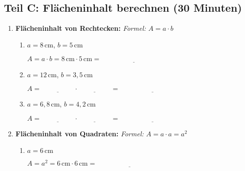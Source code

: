 \subsection*{Teil C: Flächeninhalt berechnen (30 Minuten)}

\begin{enumerate}[label=\arabic*.]
    \item \textbf{Flächeninhalt von Rechtecken:}
    \textit{Formel: $A = a \cdot b$}
    \vspace{0.5cm}

    \begin{enumerate}[label=\alph*)]
        \item $a = 8\,\text{cm}$, $b = 5\,\text{cm}$

        $A = a \cdot b = 8\,\text{cm} \cdot 5\,\text{cm} = \underline{\hspace{4cm}}$

        \vspace{0.5cm}

        \item $a = 12\,\text{cm}$, $b = 3{,}5\,\text{cm}$

        $A = \underline{\hspace{2cm}} \cdot \underline{\hspace{2cm}} = \underline{\hspace{4cm}}$

        \vspace{0.5cm}

        \item $a = 6{,}8\,\text{cm}$, $b = 4{,}2\,\text{cm}$

        $A = \underline{\hspace{2cm}} \cdot \underline{\hspace{2cm}} = \underline{\hspace{4cm}}$
    \end{enumerate}

    \vspace{1cm}

    \item \textbf{Flächeninhalt von Quadraten:}
    \textit{Formel: $A = a \cdot a = a^2$}
    \vspace{0.5cm}

    \begin{enumerate}[label=\alph*)]
        \item $a = 6\,\text{cm}$

        $A = a^2 = 6\,\text{cm} \cdot 6\,\text{cm} = \underline{\hspace{4cm}}$


\end{enumerate}
\end{enumerate}
